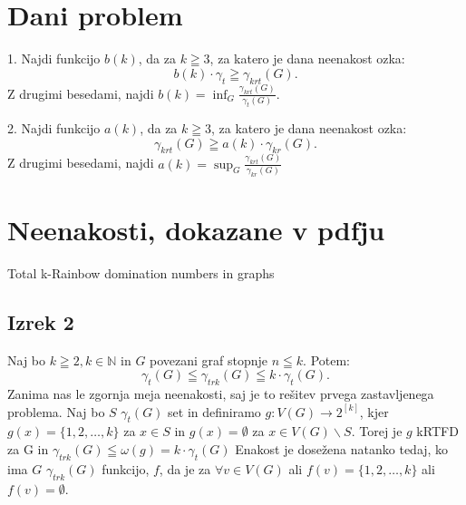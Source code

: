 \documentclass[12pt,a4paper]{amsart}
\begin{document}
\section{Dani problem}

1.
Najdi funkcijo $b(k)$, da za $k \geqq 3$, za katero je dana neenakost ozka:
\begin{equation}
  b(k) \cdot \gamma_t \geqq \gamma_{krt}(G).
\end{equation}
Z drugimi besedami, najdi $b(k) = \inf_G \frac{\gamma_{krt}(G)}{\gamma_t(G)}$.

2.
Najdi funkcijo $a(k)$, da za $k \geqq 3$, za katero je dana neenakost ozka:
\begin{equation}
  \gamma_{krt}(G) \geqq a(k) \cdot \gamma_{kr}(G).
\end{equation}
Z drugimi besedami, najdi $a(k) = \sup_G \frac{\gamma_{krt}(G)}{\gamma_{kr}(G)}$

\pagebreak

\section{Neenakosti, dokazane v pdfju}
Total k-Rainbow domination numbers in graphs

\subsection{Izrek 2}
Naj bo $k \geqq 2, k\in \mathbb N$ in $G$ povezani graf stopnje $n \leqq k$.
Potem:
\begin{equation}
  \gamma_t (G) \leqq \gamma_{trk}(G) \leqq k\cdot \gamma_t(G).
\end{equation}
 Zanima nas le zgornja meja neenakosti, saj je to rešitev prvega zastavljenega problema.
\proof
Naj bo $S$ $\gamma_t(G)$ set in definiramo $g: V(G) \rightarrow 2^{[k]}$, kjer $g(x) = \{1,2,\ldots,k\}$ za $x \in S$ in $g(x) = \emptyset$ za $x \in V(G)\backslash S$. Torej je $g$ kRTFD za G in $\gamma_{trk}(G) \leqq \omega(g) = k\cdot \gamma_t(G)$
\endproof
Enakost je dosežena natanko tedaj, ko ima $G$ $\gamma_{trk}(G)$ funkcijo, $f$, da je za $\forall v \in V(G)$ ali $f(v) = \{1,2,\ldots,k\}$ ali $f(v) = \emptyset$.
\end{document}
